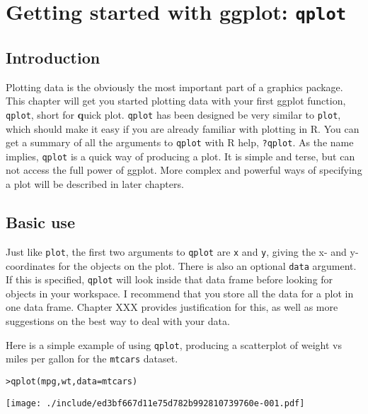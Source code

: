 



\chapter{Getting started with ggplot: {\tt qplot}}

\section{Introduction}

Plotting data is the obviously the most important part of a graphics package.  This chapter will get you started plotting data with your first ggplot function, {\tt qplot}, short for {\bf q}uick plot.  {\tt qplot} has been designed be very similar to {\tt plot}, which should make it easy if you are already familiar with plotting in R.  You can get a summary of all the arguments to {\tt qplot} with R help, {\tt ?qplot}.  As the name implies, {\tt qplot} is a quick way of producing a plot.  It is simple and terse, but can not access the full power of ggplot.  More complex and powerful ways of specifying a plot will be described in later chapters.

\section{Basic use}\label{sec:basic_use}

Just like {\tt plot}, the first two arguments to {\tt qplot} are {\tt x} and {\tt y}, giving the x- and y-coordinates for the objects on the plot. There is also an optional {\tt data} argument.  If this is specified, {\tt qplot} will look inside that data frame before looking for objects in your workspace.  I recommend that you store all the data for a plot in one data frame.  Chapter XXX provides justification for this, as well as more suggestions on the best way to deal with your data.  

Here is a  simple example of using {\tt qplot}, producing a scatterplot of weight vs miles per gallon for the {\tt mtcars} dataset.  

\begin{alltt}
> qplot(mpg, wt, data = mtcars)
\end{alltt}
\texttt{[image: ./include/ed3bf667d11e75d782b992810739760e-001.pdf]}
\begin{alltt}

\end{alltt}%

